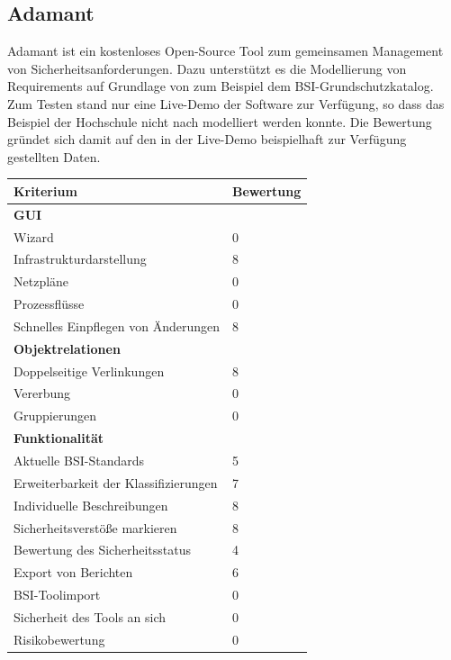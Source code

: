 \subsection{Adamant}
Adamant ist ein kostenloses Open-Source Tool zum gemeinsamen Management von Sicherheitsanforderungen. Dazu unterstützt es die Modellierung von Requirements auf Grundlage von zum Beispiel dem BSI-Grundschutzkatalog.\cite{adamant}\\ 
Zum Testen stand nur eine Live-Demo der Software zur Verfügung, so dass das Beispiel der Hochschule nicht nach modelliert werden konnte. Die Bewertung gründet sich damit auf den in der Live-Demo beispielhaft zur Verfügung gestellten Daten.\\

\begin{table}[h!bt]
	\begin{tabular}{|p{}|p{}|}
		\hline 
		Kriterium & Bewertung\\ 
		\hline 
		\textbf{GUI}& \\
		\hline
		Wizard & 0\\
		\hline 
		Infrastrukturdarstellung & 8 \\
		\hline 
		Netzpläne & 0 \\
		\hline 
		Prozessflüsse & 0 \\
		\hline 
		Schnelles Einpflegen von Änderungen & 8 \\
		\hline
		\textbf{Objektrelationen} & \\
		\hline 
		Doppelseitige Verlinkungen & 8 \\
		\hline 
		Vererbung & 0 \\
		\hline 
		Gruppierungen & 0 \\
		\hline 
		\textbf{Funktionalität} &\\
		\hline 
		Aktuelle BSI-Standards & 5 \\
		\hline  
		Erweiterbarkeit der Klassifizierungen & 7 \\
		\hline 
		Individuelle Beschreibungen & 8 \\
		\hline 
		Sicherheitsverstöße markieren & 8 \\
		\hline
		Bewertung des Sicherheitsstatus & 4 \\
		\hline
		Export von Berichten & 6 \\
		\hline
		BSI-Toolimport & 0 \\
		\hline
		Sicherheit des Tools an sich & 0 \\
		\hline
		Risikobewertung & 0 \\

\end{tabular}
\end{table}
